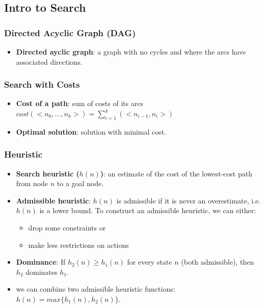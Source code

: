 \documentclass{article}
\begin{document}
\subsection{Intro to Search}

\subsubsection{Directed Acyclic Graph (DAG)}

\begin{itemize}
    \item \textbf{Directed ayclic graph}: a graph with no cycles and where the arcs have associated directions.
\end{itemize}

\subsubsection{Search with Costs}

\begin{itemize}
    \item \textbf{Cost of a path}: sum of costs of its arcs $cost(<n_0, \ldots, n_k>) = \sum\limits_{i=1}^{k} (<n_{i-1}, n_i>)$
    \item \textbf{Optimal solution}: solution with minimal cost.
\end{itemize}

\subsubsection{Heuristic}

\begin{itemize}
    \item \textbf{Search heuristic ($h(n)$)}: an estimate of the cost of the lowest-cost path from node $n$ to a goal node.
    \item \textbf{Admissible heuristic}: $h(n)$ is admissible if it is never an overestimate, i.e. $h(n)$ is a lower bound. To construct an admissible heuristic, we can either:
    \begin{itemize}
        \item drop some constraints or
        \item make less restrictions on actions
    \end{itemize}
    \item \textbf{Dominance}: If $h_2(n) \geq h_1(n)$ for every state $n$ (both admissible), then $h_2$ dominates $h_1$.
    \item we can combine two admissible heuristic functions: $h(n) = max\{h_1(n), h_2(n)\}$.
\end{itemize}
\end{document}
